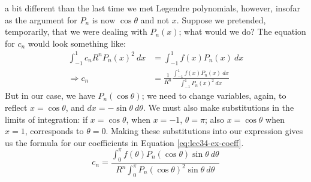  a bit different than the last time we met Legendre polynomials, however, insofar as the argument for $P_n$ is now $\cos{\theta}$ and not $x$.  Suppose we pretended, temporarily, that we were dealing with $P_n(x)$; what would we do?  The equation for $c_n$ would look something like:
\begin{align*}
\int_{-1}^{1}c_n R^n P_n(x)^2 \ dx &= \int_{-1}^{1} f(x) P_n(x) \ dx \\
\Rightarrow c_n &= \frac{1}{R^n}\frac{\int_{-1}^{1} f(x) P_n(x) \ dx}{\int_{-1}^{1} P_n(x)^2 \ dx}
\end{align*}
But in our case, we have $P_n(\cos{\theta})$; we need to change variables, again, to reflect $x = \cos{\theta}$, and $dx = -\sin{\theta} \ d\theta$.  We must also make substitutions in the limits of integration: if $x=\cos{\theta}$, when $x=-1$, $\theta = \pi$;  also $x=\cos{\theta}$ when $x=1$, corresponds to $\theta = 0$.  Making these substitutions into our expression gives us the formula for our coefficients in Equation \ref{eq:lec34-ex-coeff}.
\begin{equation}
c_n = \frac{\int_{0}^{\pi} f(\theta) P_n(\cos{\theta}) \sin{\theta} \ d\theta}{R^n\int_{0}^{\pi} P_n(\cos{\theta})^2 \sin{\theta} \ d\theta}
\label{eq:lec34-ex-coeff}
\end{equation}


